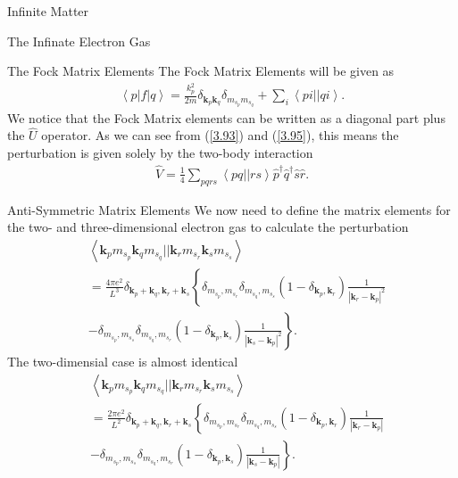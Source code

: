 \documentclass[twoside,english]{uiofysmaster}
\begin{document}
\begin{chapter}{Infinite Matter}
\begin{section}{The Infinate Electron Gas}
		\begin{subsection}{The Fock Matrix Elements}
			The Fock Matrix Elements will be given as
			\begin{align}
				\left< p | f | q \right> = \frac{k_p^2}{2m} \delta_{\mathbf{k}_p \mathbf{k}_q} \delta_{m_{s_p} m_{s_q}} + \sum_i \left<pi||qi\right>.
			\end{align}
			We notice that the Fock Matrix elements can be written as a diagonal part plus the $\hat U$ operator. As we can see from (\ref{3.93}) and (\ref{3.95}), this means the perturbation is given solely by the two-body interaction
			\begin{align}
				\hat V = \frac{1}{4} \sum_{pqrs} \left<pq||rs\right> \hat p^\dagger \hat q^\dagger \hat s \hat r.
			\end{align}
		\end{subsection}

		\begin{subsection}{Anti-Symmetric Matrix Elements}
			We now need to define the matrix elements for the two- and three-dimensional electron gas to calculate the perturbation 
			\begin{align}
				&\left< \mathbf{k}_p m_{s_p} \mathbf{k}_q m_{s_q} || \mathbf{k}_r m_{s_r} \mathbf{k}_s m_{s_s} \right> \\
				&= \frac{4 \pi e^2}{L^3} \delta_{\mathbf{k}_p + \mathbf{k}_q, \mathbf{k}_r + \mathbf{k}_s} \left\{ \delta_{ m_{s_p},m_{s_r} } \delta_{ m_{s_q},m_{s_s} } (1 - \delta_{\mathbf{k}_p, \mathbf{k}_r}) \frac{1}{| \mathbf{k}_r - \mathbf{k}_p|^2} \right. \nonumber \\
				& - \delta_{ m_{s_p},m_{s_s} } \delta_{ m_{s_q},m_{s_r} } (1 - \delta_{\mathbf{k}_p, \mathbf{k}_s}) \left. \frac{1}{| \mathbf{k}_s - \mathbf{k}_p|^2}  \right\}. \nonumber
			\end{align}
			The two-dimensial case is almost identical
			\begin{align}
				&\left< \mathbf{k}_p m_{s_p} \mathbf{k}_q m_{s_q} || \mathbf{k}_r m_{s_r} \mathbf{k}_s m_{s_s} \right> \\
				&= \frac{2 \pi e^2}{L^2} \delta_{\mathbf{k}_p + \mathbf{k}_q, \mathbf{k}_r + \mathbf{k}_s} \left\{ \delta_{ m_{s_p},m_{s_r} } \delta_{ m_{s_q},m_{s_s} } (1 - \delta_{\mathbf{k}_p, \mathbf{k}_r}) \frac{1}{| \mathbf{k}_r - \mathbf{k}_p|} \right. \nonumber \\
				& - \delta_{ m_{s_p},m_{s_s} } \delta_{ m_{s_q},m_{s_r} } (1 - \delta_{\mathbf{k}_p, \mathbf{k}_s}) \left. \frac{1}{| \mathbf{k}_s - \mathbf{k}_p|}  \right\}. \nonumber
			\end{align}		
		\end{subsection}


\end{section}
\end{chapter}
\end{document}
